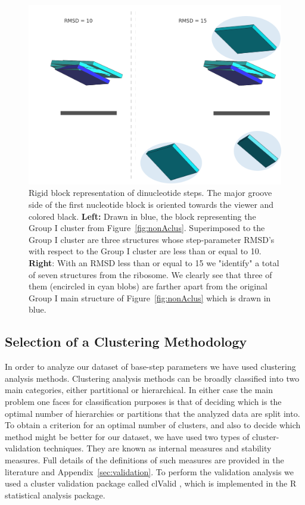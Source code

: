 \begin{figure}[htp]
 \centering
\includegraphics[angle=0, scale=1.5]{Chapter2/G1at10_15b.png}
\caption{Rigid block  representation of dinucleotide  steps. The major
  groove side  of the first  nucleotide block is oriented  towards the
  viewer  and colored  black. \textbf{Left:}  Drawn in  blue,  the block
  representing     the        Group       I       cluster       from
  Figure~\ref{fig:nonAclus}. Superimposed  to the Group  I cluster are
  three  structures whose  step-parameter RMSD's  with respect  to the
  Group I  cluster are less than  or equal to  10. \textbf{Right}:
  With an RMSD less than or equal  to 15 we "identify" a total of
  seven structures  from the  ribosome. We clearly  see that  three of
  them (encircled in  cyan blobs) are farther apart  from the original
  Group I  main structure of Figure~\ref{fig:nonAclus}  which is drawn
  in blue.}
 \label{fig:superimpose}
\end{figure}

\subsection{Selection of a Clustering Methodology} 
In order to  analyze our dataset of base-step  parameters we have used
clustering  analysis  methods.   Clustering  analysis methods  can  be
broadly  classified into  two main  categories, either  partitional or
hierarchical.   In  either  case   the  main  problem  one  faces  for
classification  purposes is  that  of deciding  which  is the  optimal
number of hierarchies  or partitions that the analyzed  data are split
into.  To  obtain a criterion for  an optimal number  of clusters, and
also to decide  which method might be better for  our dataset, we have
used two  types of cluster-validation  techniques.  They are  known as
internal  measures  and  stability  measures.   Full  details  of  the
definitions  of   such  measures   are  provided  in   the  literature
\cite{handl2005,  brock2008}  and  Appendix~\ref{sec:validation}.   To
perform the  validation analysis we used a  cluster validation package
called  clValid  \cite{brock2008},  which  is  implemented  in  the  R
\cite{rcite} statistical analysis package.

